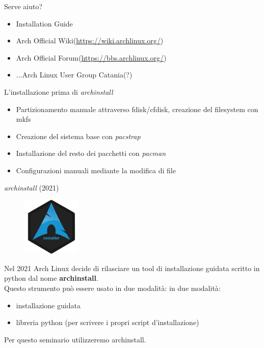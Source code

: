 
\begin{frame}{Serve aiuto?}
    \begin{itemize}
        \item Installation Guide
        \item Arch Official Wiki(\url{https://wiki.archlinux.org/})
        \item Arch Official Forum(\url{https://bbs.archlinux.org/})
        \item ...Arch Linux User Group Catania(?)
    \end{itemize}
\end{frame}

\begin{frame}{L'installazione prima di \textit{archinstall}}
    \begin{itemize}
        \item Partizionamento manuale attraverso fdisk/cfdisk, creazione del filesystem con mkfs
        \item Creazione del sistema base con \textit{pacstrap}
        \item Installazione del resto dei pacchetti con \textit{pacman}
        \item Configurazioni manuali mediante la modifica di file
    \end{itemize}
\end{frame}


\begin{frame}{\textit{archinstall} (2021)}
    \begin{figure}[h]
        \includegraphics[width=0.25\textwidth]{images/archinstall.png}
    \end{figure}
Nel 2021 Arch Linux decide di rilasciare un tool di installazione guidata scritto in python dal nome \textbf{archinstall}. \\
Questo strumento può essere usato in due modalità:
in due modalità:
    \begin{itemize}
        \item installazione guidata
        \item libreria python (per scrivere i propri script d'installazione)
    \end{itemize}
\vspace{10pt}
Per questo seminario utilizzeremo archinstall.
\end{frame}

